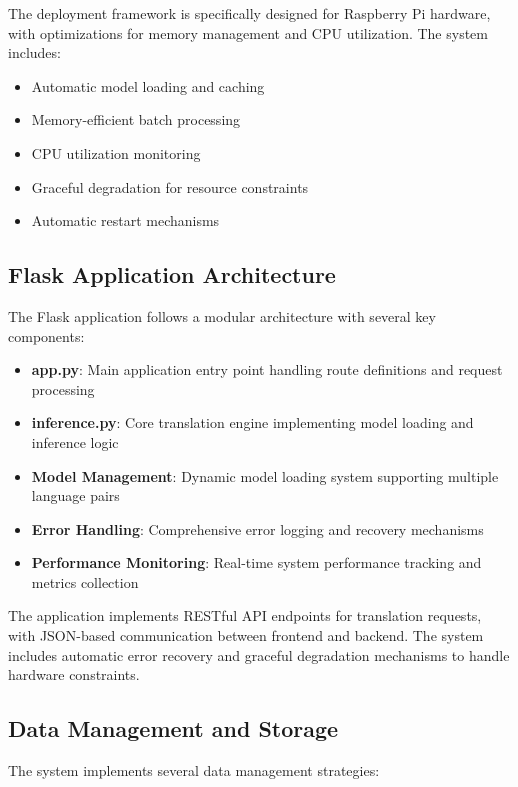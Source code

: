 \documentclass[conference]{IEEEtran}
\begin{document}
The deployment framework is specifically designed for Raspberry Pi hardware, with optimizations for memory management and CPU utilization. The system includes:

\begin{itemize}
    \item Automatic model loading and caching
    \item Memory-efficient batch processing
    \item CPU utilization monitoring
    \item Graceful degradation for resource constraints
    \item Automatic restart mechanisms
\end{itemize}

\subsection{Flask Application Architecture}

The Flask application follows a modular architecture with several key components:

\begin{itemize}
    \item \textbf{app.py}: Main application entry point handling route definitions and request processing
    \item \textbf{inference.py}: Core translation engine implementing model loading and inference logic
    \item \textbf{Model Management}: Dynamic model loading system supporting multiple language pairs
    \item \textbf{Error Handling}: Comprehensive error logging and recovery mechanisms
    \item \textbf{Performance Monitoring}: Real-time system performance tracking and metrics collection
\end{itemize}

The application implements RESTful API endpoints for translation requests, with JSON-based communication between frontend and backend. The system includes automatic error recovery and graceful degradation mechanisms to handle hardware constraints.

\subsection{Data Management and Storage}

The system implements several data management strategies:
\end{document}
